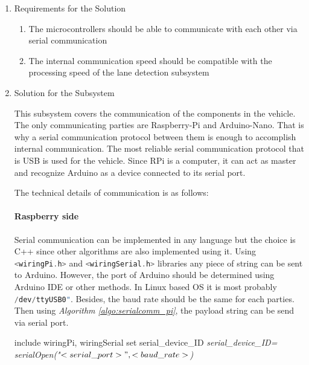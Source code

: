 \documentclass[a4paper,12pt]{article}
\begin{document}
	\begin{enumerate}
		\item {Requirements for the Solution}
		
		\begin{enumerate}
			\item The microcontrollers should be able to communicate with each other via serial communication
			\item The internal communication speed should be compatible with the processing speed of the lane detection subsystem  
		\end{enumerate}
	
	\item {Solution for the Subsystem}

		This subsystem covers the communication of the components in the vehicle. The only communicating parties are Raspberry-Pi and Arduino-Nano. That is why a serial communication protocol between them is enough to accomplish internal communication. The most reliable serial communication protocol that is USB is used for the vehicle. Since RPi is a computer, it can act as master and recognize Arduino as a device connected to its serial port. 
		
		The technical details of communication is as follows:
		
		\paragraph*{Raspberry side}
		
		Serial communication can be implemented in any language but the choice is C++ since other algorithms are also implemented using it. Using \lstinline[language=C++]|<wiringPi.h>| and \lstinline[language=C++]|<wiringSerial.h>| libraries any piece of string can be sent to Arduino. However, the port of Arduino should be determined using Arduino IDE or other methods. In Linux based OS it is most probably \lstinline[language=C++]|/dev/ttyUSB0"|. Besides, the baud rate should be the same for each parties. Then using \textit{Algorithm \ref{algo:serialcomm_pi}}, the payload string can be send via serial port.
		
		\begin{algorithm}
			\DontPrintSemicolon
			include wiringPi, wiringSerial \;
			set serial\_device\_ID \;
			\textit{serial\_device\_ID= serialOpen("$ <serial\_port> ",<baud\_rate>$)}\;
			

\end{algorithm}
\end{enumerate}
\end{document}
